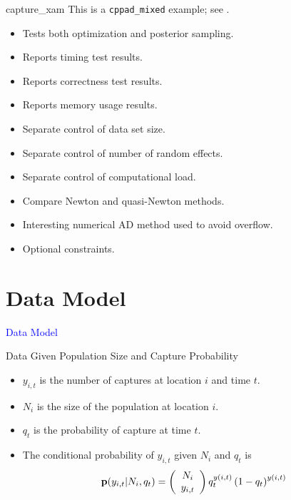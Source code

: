 \documentclass{beamer}
\newcommand{\Blue}[1]{\textcolor{blue}{#1}}
\newcommand{\B}[1]{{\bf #1}}
\newcommand{\Section}[1]{
	\section{#1}
	\begin{frame}
	\begin{center}
	\Blue{ \Large{#1} }
	\end{center}
	\end{frame}
}
\begin{document}
\begin{frame}{capture\_xam}
This is a \texttt{cppad\_mixed} example; see  \cite{Royle2004}.

\begin{itemize}

\item
Tests both optimization and posterior sampling.
\pause

\item
Reports timing test results.
\pause

\item
Reports correctness test results.
\pause

\item
Reports memory usage results.
\pause

\item
Separate control of data set size.
\pause

\item
Separate control of number of random effects.
\pause

\item
Separate control of computational load.
\pause

\item
Compare Newton and quasi-Newton methods.
\pause

\item
Interesting numerical AD method used to avoid overflow.
\pause

\item
Optional constraints.

\end{itemize}
\end{frame}

\Section{Data Model}

\begin{frame}{Data Given Population Size and Capture Probability}
\begin{itemize}

\item
$y_{i,t}$ is the number of captures at location $i$ and time $t$.
\pause

\item
$N_i$ is the size of the population at location $i$.
\pause

\item
$q_t$ is the probability of capture at time $t$.
\pause

\item
The conditional probability of $y_{i,t}$ given $N_i$ and $q_t$ is
\[
\B{p} ( y_{i,t} | N_i , q_t )
=
\left( \begin{array}{c} N_i \\ y_{i,t} \end{array} \right)
q_t^{y(i,t)} \left( 1 - q_t\right)^{y(i,t)}
\]

\end{itemize}
\end{frame}
\end{document}
